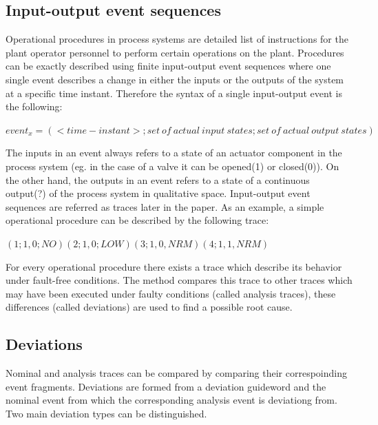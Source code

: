 \documentclass[conference]{IEEEtran}
\begin{document}
\subsection{Input-output event sequences}

Operational procedures in process systems are detailed list of instructions for the plant operator personnel to perform certain operations on the plant. Procedures can be exactly described using finite input-output event sequences where one single event describes a change in either the inputs or the outputs of the system at a specific time instant. Therefore the syntax of a single input-output event is the following:

$event_x = (<time-instant>;{set~of~actual~input~states};{set~of~actual~output~states})$

The inputs in an event always refers to a state of an actuator component in the process system (eg. in the case of a valve it can be opened(1) or closed(0)). On the other hand, the outputs in an event refers to a state of a continuous output(?) of the process system in qualitative space. Input-output event sequences are referred as traces later in the paper. As an example, a simple operational procedure can be described by the following trace:

$(1;1,0;NO) (2;1,0;LOW) (3;1,0,NRM) (4;1,1,NRM)$

For every operational procedure there exists a trace which describe its behavior under fault-free conditions. The method compares this trace to other traces which may have been executed under faulty conditions (called analysis traces), these differences (called deviations) are used to find a possible root cause.

\subsection{Deviations}
Nominal and analysis traces can be compared by comparing their correspoinding event fragments. Deviations are formed from a deviation guideword and the nominal event from which the corresponding analysis event is deviationg from. Two main deviation types can be distinguished.
\end{document}
